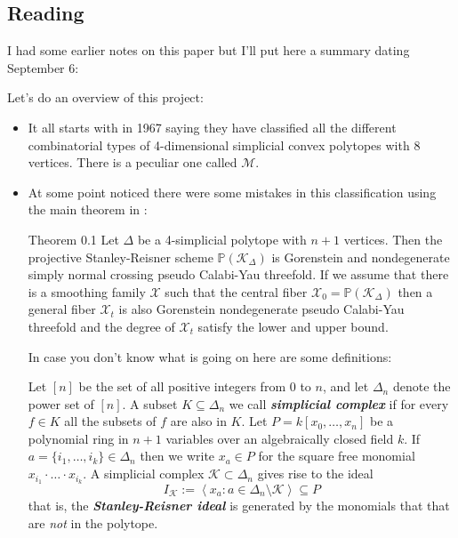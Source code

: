 \subsection{Reading \cite{luk1}}

{\color{1}I had some earlier notes on this paper but I'll put here a summary dating September 6:}
\vspace{1em}

Let's do an overview of this project:

\begin{itemize}
	\item It all starts with \cite{grun} in 1967 saying they have classified all the different combinatorial types of 4-dimensional simplicial convex polytopes with 8 vertices. There is a peculiar one called $\mathcal{M}$.

	\item At some point \cite{luk1} noticed there were some mistakes in this classification using the main theorem in \cite{luk1}:

		\begin{thing2}{Theorem 0.1}\leavevmode
			Let $\Delta$ be a 4-simplicial polytope with $n+1$ vertices. Then the projective Stanley-Reisner scheme $\mathbb{P}(\mathcal{K}_{\Delta})$ is Gorenstein and nondegenerate simply normal crossing pseudo Calabi-Yau threefold. If we assume that there is a smoothing family $\mathcal{X}$ such that the central fiber $\mathcal{X}_0=\mathbb{P}(\mathcal{K}_{\Delta})$ then a general fiber $\mathcal{X}_t$ is also Gorenstein nondegenerate pseudo Calabi-Yau threefold and the degree of $\mathcal{X}_t$ satisfy the lower and upper bound.
		\end{thing2}
		{\color{9}In case you don't know what is going on here are some definitions:}

		Let $[n]$ be the set of all positive integers from 0 to $n$, and let $\Delta_n$ denote the power set of $[n]$. A subset $K\subseteq \Delta_n$ we call \textit{\textbf{simplicial complex}} if for every $f\in K$ all the subsets of $f$ are also in $K$. Let $P=k[x_0,\ldots,x_n]$ be a polynomial ring in $n+1$ variables over an algebraically closed field $k$. If $a=\{i_1,\ldots,i_k\} \in\Delta_n$ then we write $x_a\in P$ for the square free monomial $x_{i_1}\cdot \ldots\cdot x_{i_k}$. A simplicial complex $\mathcal{K}\subset \Delta_n$ gives rise to the ideal
		\[I_{\mathcal{K}}:=\left<x_a: a\in\Delta_n\setminus \mathcal{K}\right> \subseteq P\]
		{\color{persimmon}that is, the \textit{\textbf{Stanley-Reisner ideal}} is generated by the monomials that that are \textit{not} in the polytope.}


\end{itemize}
